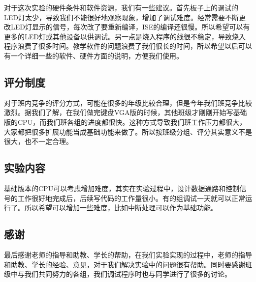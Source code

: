 对于这次实验的硬件条件和软件资源，我们有一些建议。首先板子上的调试的LED灯太少，导致我们不能很好地观察现象，增加了调试难度。经常需要不断更改LED灯显示的信号，每次改了要重新编译，ISE的编译还很慢。所以希望可以有更多的LED灯或其他设备以供调试。另一点是烧入程序的线很不稳定，导致烧入程序浪费了很多时间。教学软件的问题浪费了我们很长的时间，所以希望以后可以有一个详细一些的软件、硬件方面的说明，方便我们使用。

\subsection{评分制度}

对于班内竞争的评分方式，可能在很多的年级比较合理，但是今年我们班竞争比较激烈。据我们了解，在我们做完键盘VGA版的时候，其他班级才刚刚开始写基础版的CPU，而我们班各组的进度都很快。这种方式导致我们班工作压力都很大，大家都把很多扩展功能当成基础功能来做了。所以按班级分组、评分其实意义不是很大，也不一定合理。

\subsection{实验内容}

基础版本的CPU可以考虑增加难度，其实在实验过程中，设计数据通路和控制信号的工作很好地完成后，后续写代码的工作量很小。有的组调试一天就可以正常运行了。所以希望可以增加一些难度，比如中断处理可以作为基础功能。

\subsection{感谢}

最后感谢老师的指导和助教、学长的帮助，在我们实验实现的过程中，老师的指导和助教、学长的经验、意见，对于我们解决实验中的问题很有帮助。同时要感谢班级中与我们共同努力的各组，我们调试程序时也与同学进行了很多的讨论。


